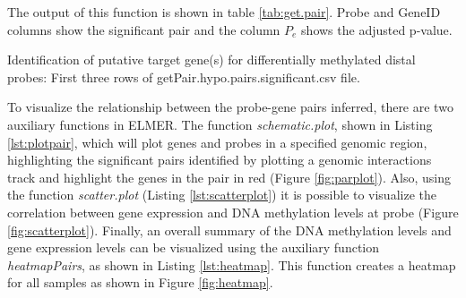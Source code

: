 


The output of this function is shown in table \ref{tab:get.pair}. Probe and GeneID
columns show the significant pair and the column $P_e$ shows the adjusted p-value.
\begin{table}[h!]
\centering
\small
{}
\caption [Identification of putative target gene(s) for differentially methylated distal probes]{
Identification of putative target gene(s) for differentially methylated distal probes: First three rows of  getPair.hypo.pairs.significant.csv file.
}
\label{tab:get.pair}
\end{table}

To visualize the relationship between the probe-gene pairs inferred, there are two auxiliary functions in ELMER. The function \textit{schematic.plot}, shown in Listing \ref{lst:plotpair}, which will plot genes and probes in a specified genomic region, highlighting the significant pairs identified by plotting a genomic interactions track and highlight the genes in the pair in red (Figure \ref{fig:parplot}). Also,  using the function \textit{scatter.plot} (Listing \ref{lst:scatterplot}) it is possible to visualize the correlation between gene expression and DNA methylation levels at probe (Figure \ref{fig:scatterplot}).
 Finally, an overall summary of the DNA  methylation levels and gene expression levels  can be visualized using the auxiliary function \textit{heatmapPairs}, as shown in Listing \ref{lst:heatmap}. This function creates a heatmap for all samples  as shown in Figure \ref{fig:heatmap}.



